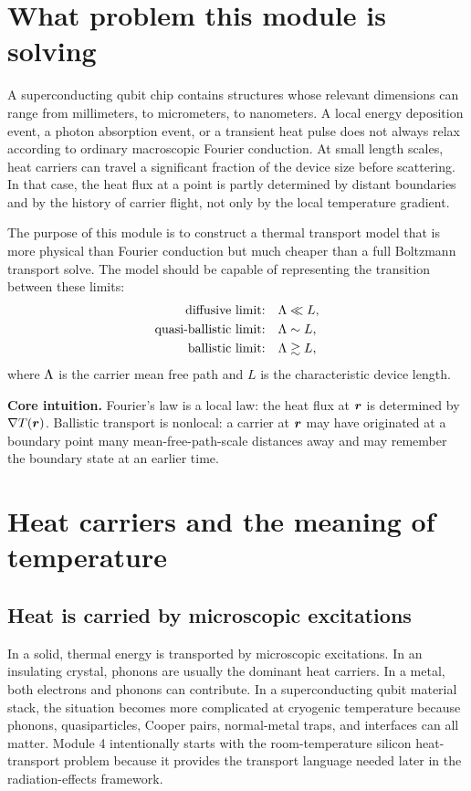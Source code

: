 \documentclass[11pt]{article}
\begin{document}
\section{What problem this module is solving}
A superconducting qubit chip contains structures whose relevant dimensions can range from millimeters, to micrometers, to nanometers. A local energy deposition event, a photon absorption event, or a transient heat pulse does not always relax according to ordinary macroscopic Fourier conduction. At small length scales, heat carriers can travel a significant fraction of the device size before scattering. In that case, the heat flux at a point is partly determined by distant boundaries and by the history of carrier flight, not only by the local temperature gradient.

The purpose of this module is to construct a thermal transport model that is more physical than Fourier conduction but much cheaper than a full Boltzmann transport solve. The model should be capable of representing the transition between these limits:
\begin{align}
\text{diffusive limit:} \quad & \Lambda \ll L, \\
\text{quasi-ballistic limit:} \quad & \Lambda \sim L, \\
\text{ballistic limit:} \quad & \Lambda \gtrsim L,
\end{align}
where \(\Lambda\) is the carrier mean free path and \(L\) is the characteristic device length.

\begin{physicsbox}
\textbf{Core intuition.} Fourier's law is a local law: the heat flux at \(\bm{r}\) is determined by \(\nabla T(\bm{r})\). Ballistic transport is nonlocal: a carrier at \(\bm{r}\) may have originated at a boundary point many mean-free-path-scale distances away and may remember the boundary state at an earlier time.
\end{physicsbox}

\section{Heat carriers and the meaning of temperature}
\subsection{Heat is carried by microscopic excitations}
In a solid, thermal energy is transported by microscopic excitations. In an insulating crystal, phonons are usually the dominant heat carriers. In a metal, both electrons and phonons can contribute. In a superconducting qubit material stack, the situation becomes more complicated at cryogenic temperature because phonons, quasiparticles, Cooper pairs, normal-metal traps, and interfaces can all matter. Module 4 intentionally starts with the room-temperature silicon heat-transport problem because it provides the transport language needed later in the radiation-effects framework.
\end{document}

